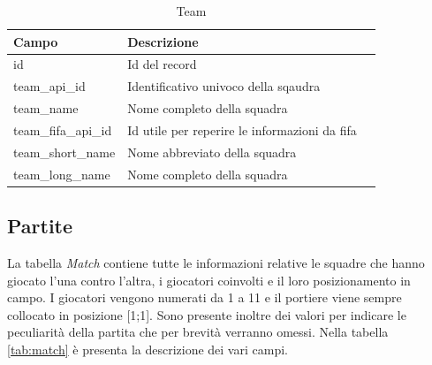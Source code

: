 \documentclass[hidelinks, 12pt]{article}
\begin{document}
	\begin{table}[H]
	\caption{Team}\label{tab:team}
	\begin{tabular}{|l|l|l|}
		\hline
		Campo & Descrizione \\
		\hline
		id & Id del record \\
		team\_api\_id & Identificativo univoco della sqaudra \\
		team\_name & Nome completo della squadra \\
		team\_fifa\_api\_id & Id utile per reperire le informazioni da fifa \\
		team\_short\_name & Nome abbreviato della squadra \\
		team\_long\_name & Nome completo della squadra \\
		\hline
	\end{tabular}
	\end{table}
	
	\subsection{Partite}
	
	La tabella {\it Match} contiene tutte le informazioni relative le squadre che hanno giocato l'una contro l'altra, i giocatori coinvolti e il loro posizionamento in campo. I giocatori vengono numerati da 1 a 11 e il portiere viene sempre collocato in posizione [1;1]. Sono presente inoltre dei valori per indicare le peculiarità della partita che per brevità verranno omessi. Nella tabella \ref{tab:match} è presenta la descrizione dei vari campi. 
	
\end{document}
